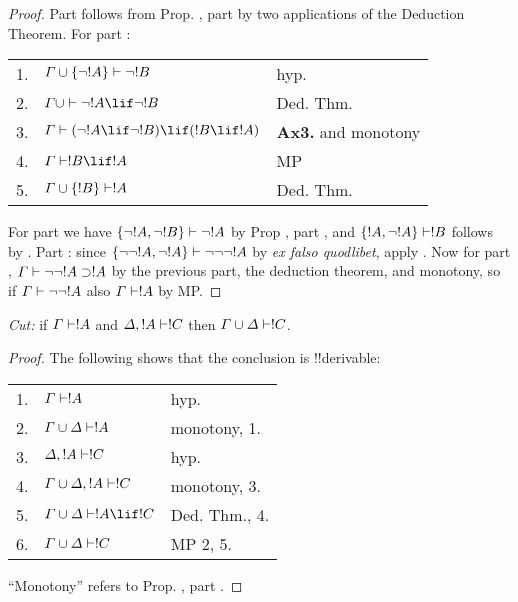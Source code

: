 \documentclass[../../include/open-logic-section]{subfiles}
\begin{document}
\begin{proof}
Part  follows from Prop. , part
 by two applications of the Deduction
Theorem. For part :

\begin{tabular}{rll}
  1. & $\Gamma \cup \{ \lnot !A\} \Proves \lnot !B$ & hyp. \\
  2. & $\Gamma \cup \Proves \lnot !A \lif \lnot !B$ & Ded. Thm.\\
  3. & $\Gamma \Proves (\lnot !A \lif \lnot !B) \lif (!B
  \lif !A)$ & \textbf{Ax3.} and monotony \\
  4. & $\Gamma \Proves !B \lif !A$ & MP \\
  5. & $\Gamma \cup \{ !B\} \Proves !A$ & Ded. Thm.
\end{tabular}
  
\noindent For part  we have $\{\lnot !A,
\lnot !B \} \Proves \lnot !A$ by Prop , part
, and $\{ !A, \lnot!A\} \Proves
!B$ follows by . Part  : since
$\{\lnot\lnot !A, \lnot !A \} \Proves \lnot \lnot\lnot
!A$ by \emph{ex falso quodlibet}, apply  . Now
for part  , $\Gamma \Proves \lnot\lnot !A
\supset !A$ by the previous part, the deduction theorem, and
monotony, so if $\Gamma \Proves \lnot\lnot!A$ also $\Gamma \Proves
!A$ by MP. 
\end{proof}

\begin{thm}
  \emph{Cut:} if $\Gamma \Proves !A$ and $\Delta, !A \Proves
  !C$ then $\Gamma \cup \Delta \Proves !C$. 
\end{thm}

\begin{proof}
The following shows that the conclusion is !!{derivable}:

\begin{tabular}{rll}
1. & $\Gamma \Proves !A$ & hyp. \\
2. & $\Gamma\cup\Delta \Proves !A$ & monotony, 1.\\
3. & $\Delta, !A \Proves !C$ & hyp. \\
4. & $\Gamma \cup \Delta, !A \Proves !C$ & monotony, 3.\\
5. & $\Gamma \cup \Delta \Proves !A \lif !C$ & Ded. Thm., 4.\\
6. &  $\Gamma \cup \Delta \Proves !C$ & MP 2, 5.
\end{tabular}

\smallskip\noindent
``Monotony'' refers to Prop. , part
.
\end{proof}
\end{document}
